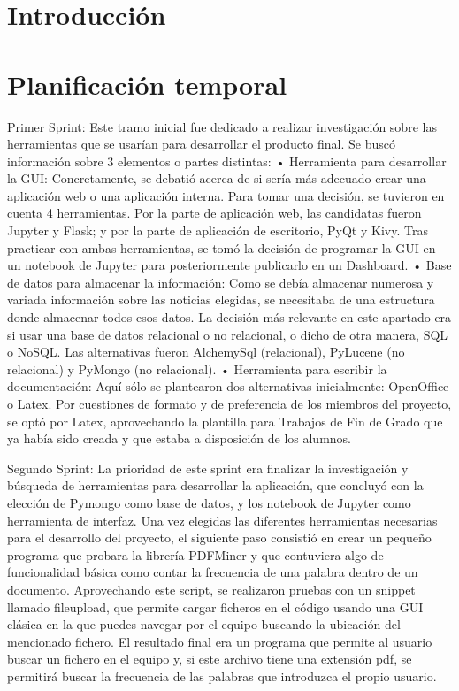 
\section{Introducción}

\section{Planificación temporal}
Primer Sprint:
Este tramo inicial fue dedicado a realizar investigación sobre las herramientas que se usarían para desarrollar el producto final. Se buscó información sobre 3 elementos o partes distintas:
•	Herramienta para desarrollar la GUI: Concretamente, se debatió acerca de si sería más adecuado crear una aplicación web o una aplicación interna. Para tomar una decisión, se tuvieron en cuenta 4 herramientas. Por la parte de aplicación web, las candidatas fueron Jupyter y Flask; y por la parte de aplicación de escritorio, PyQt y Kivy. Tras practicar con ambas herramientas, se tomó la decisión de programar la GUI en un notebook de Jupyter para posteriormente publicarlo en un Dashboard.
•	Base de datos para almacenar la información: Como se debía almacenar numerosa y variada información sobre las noticias elegidas, se necesitaba de una estructura donde almacenar todos esos datos. La decisión más relevante en este apartado era si usar una base de datos relacional o no relacional, o dicho de otra manera, SQL o NoSQL. Las alternativas fueron AlchemySql (relacional), PyLucene (no relacional) y PyMongo (no relacional).
•	Herramienta para escribir la documentación: Aquí sólo se plantearon dos alternativas inicialmente: OpenOffice o Latex. Por cuestiones de formato y de preferencia de los miembros del proyecto, se optó por Latex, aprovechando la plantilla para Trabajos de Fin de Grado que ya había sido creada y que estaba a disposición de los alumnos.

Segundo Sprint:
La prioridad de este sprint era finalizar la investigación y búsqueda de herramientas para desarrollar la aplicación, que concluyó con la elección de Pymongo como base de datos, y los notebook de Jupyter como herramienta de interfaz.
Una vez elegidas las diferentes herramientas necesarias para el desarrollo del proyecto, el siguiente paso consistió en crear un pequeño programa que probara la librería PDFMiner y que contuviera algo de funcionalidad básica como contar la frecuencia de una palabra dentro de un documento.
Aprovechando este script, se realizaron pruebas con un snippet llamado fileupload, que permite cargar ficheros en el código usando una GUI clásica en la que puedes navegar por el equipo buscando la ubicación del mencionado fichero. El resultado final era un programa que  permite al usuario buscar un fichero en el equipo y, si este archivo tiene una extensión pdf, se permitirá buscar la frecuencia de las palabras que introduzca el propio usuario.

